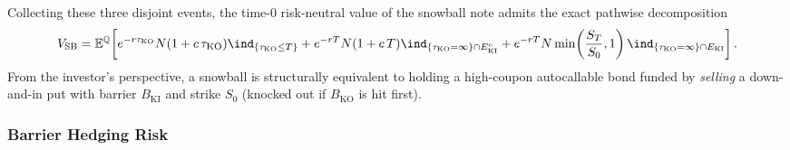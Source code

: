 Collecting these three disjoint events, the time-$0$ risk-neutral value of the snowball note admits the exact pathwise decomposition
\begin{equation}\label{eq:snowball-value}
    V_{\mathrm{SB}} = \E^{\Q}\!\left[e^{-r\tau_{\mathrm{KO}}} N(1 + c\,\tau_{\mathrm{KO}})\ind_{\{\tau_{\mathrm{KO}} \le T\}}
    + e^{-rT} N(1 + c\,T)\ind_{\{\tau_{\mathrm{KO}} = \infty\} \cap E_{\mathrm{KI}}^c}
    + e^{-rT} N\min\!\left(\frac{S_T}{S_0}, 1\right)\ind_{\{\tau_{\mathrm{KO}} = \infty\} \cap E_{\mathrm{KI}}}\right].
\end{equation}
From the investor's perspective, a snowball is structurally equivalent to holding a high-coupon autocallable bond funded by \emph{selling} a down-and-in put with barrier $B_{\mathrm{KI}}$ and strike $S_0$ (knocked out if $B_{\mathrm{KO}}$ is hit first).

\subsubsection*{Barrier Hedging Risk}

